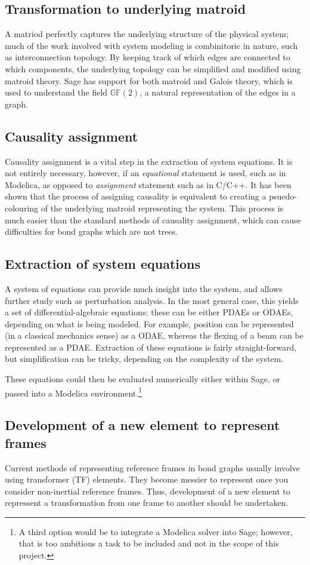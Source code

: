 \documentclass[utf,a4paper,12pt]{report}
\begin{document}
\subsection{Transformation to underlying matroid}
A matriod perfectly captures the underlying structure of the physical system; much of the work involved with system modeling is combinitoric in nature, such as interconnection topology. By keeping track of which edges are connected to which components, the underlying topology can be simplified and modified using matroid theory. Sage has support for both matroid and Galois theory, which is used to understand the field $\mathbb{GF}(2)$, a natural representation of the edges in a graph.
\subsection{Causality assignment}
Causality assignment is a vital step in the extraction of system equations.  It is not entirely necessary, however, if an \emph{equational} statement is used, such as in Modelica, as opposed to \emph{assignment} statement such as in C/C++. It has been shown that the process of assigning causality is equivalent to creating a psuedo-colouring of the underlying matroid representing the system. This process is much easier than the standard methods of causality assignment, which can cause difficulties for bond graphs which are not trees.
\subsection{Extraction of system equations}
A system of equations can provide much insight into the system, and allows further study such as perturbation analysis. In the most general case, this yields a set of differential-algebraic equations; these can be either PDAEs or ODAEs, depending on what is being modeled. For example, position can be represented (in a classical mechanics sense) as a ODAE, whereas the flexing of a beam can be represented as a PDAE. Extraction of these equations is fairly straight-forward, but simplification can be tricky, depending on the complexity of the system.

These equations could then be evaluated numerically either within Sage, or passed into a Modelica environment.\footnote{A third option would be to integrate a Modelica solver into Sage; however, that is too ambitious a task to be included and not in the scope of this project.}
\subsection{Development of a new element to represent frames}
Current methods of representing reference frames in bond graphs usually involve using transformer (TF) elements. They become messier to represent once you consider non-inertial reference frames. Thus, development of a new element to repressent a transformation from one frame to another should be undertaken.
\end{document}
